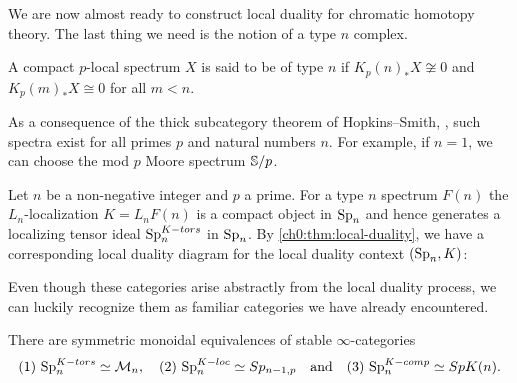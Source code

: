 We are now almost ready to construct local duality for chromatic homotopy theory. The last thing we need is the notion of a type $n$ complex. 

\begin{definition}
    A compact $p$-local spectrum $X$ is said to be of { type $n$} if $K_p(n)_* X\not\cong 0$ and $K_p(m)_*X\cong 0$ for all $m<n$. 
\end{definition}

As a consequence of the thick subcategory theorem of Hopkins--Smith, \cite[Theorem 7]{hopkins-smith_1998}, such spectra exist for all primes $p$ and natural numbers $n$. For example, if $n=1$, we can choose the mod $p$ Moore spectrum $\S/p$.  

\begin{construction}
    \label{ch0:const:chromatic-duality}
    Let $n$ be a non-negative integer and $p$ a prime. For a type $n$ spectrum $F(n)$ the $L_n$-localization $K=L_nF(n)$ is a compact object in $\sp\np$ and hence generates a localizing tensor ideal $\sp\np^{K-tors}$ in $\sp\np$. By \cref{ch0:thm:local-duality}, we have a corresponding local duality diagram for the local duality context $(\sp\np, K)$:
    \begin{center}
    \end{center}
\end{construction}

Even though these categories arise abstractly from the local duality process, we can luckily recognize them as familiar categories we have already encountered.

\begin{proposition}
    \label{ch0:prop:torsion-is-monochromatic}
    There are symmetric monoidal equivalences of stable $\infty$-categories 
    $$(1)~\sp\np^{K-tors}\simeq \M\np, \quad (2)~\sp\np^{K-loc}\simeq Sp_{n-1,p} \quad \text{and}\quad (3)~\sp\np^{K-comp}\simeq Sp\Kn.$$
\end{proposition}

